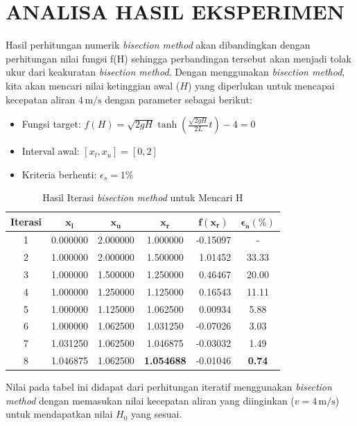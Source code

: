 \documentclass[conference]{IEEEtran}
\begin{document}
\section{ANALISA HASIL EKSPERIMEN}
Hasil perhitungan numerik \textit{bisection method} akan dibandingkan dengan perhitungan nilai fungsi f(H) sehingga perbandingan tersebut akan menjadi tolak ukur dari keakuratan \textit{bisection method}. Dengan menggunakan \textit{bisection method}, kita akan mencari nilai ketinggian awal ($H$) yang diperlukan untuk mencapai kecepatan aliran $4 \, \text{m/s}$ dengan parameter sebagai berikut:
\begin{itemize}
    \item Fungsi target: $f(H) = \sqrt{2gH} \tanh\left(\frac{\sqrt{2gH}}{2L}t\right) - 4 = 0$
    \item Interval awal: $[x_l, x_u] = [0, 2]$
    \item Kriteria berhenti: $\epsilon_s = 1\%$
\end{itemize}
\begin{table}[htbp]
\centering
\caption{Hasil Iterasi \textit{bisection method} untuk Mencari H}
\label{tab:hasil_bisection}
\renewcommand{\arraystretch}{1.2}
\begin{tabular}{|c|c|c|c|r|c|}
\hline
\textbf{Iterasi} & $\boldsymbol{x_l}$ & $\boldsymbol{x_u}$ & $\boldsymbol{x_r}$ & \multicolumn{1}{c|}{$\boldsymbol{f(x_r)}$} & $\boldsymbol{\epsilon_a (\%)}$ \\
\hline
1 & 0.000000 & 2.000000 & 1.000000 & -0.15097 & - \\
2 & 1.000000 & 2.000000 & 1.500000 & 1.01452 & 33.33 \\
3 & 1.000000 & 1.500000 & 1.250000 & 0.46467 & 20.00 \\
4 & 1.000000 & 1.250000 & 1.125000 & 0.16543 & 11.11 \\
5 & 1.000000 & 1.125000 & 1.062500 & 0.00934 & 5.88  \\
6 & 1.000000 & 1.062500 & 1.031250 & -0.07026 & 3.03  \\
7 & 1.031250 & 1.062500 & 1.046875 & -0.03032 & 1.49  \\
8 & 1.046875 & 1.062500 & \textbf{1.054688} & -0.01046 & \textbf{0.74} \\
\hline
\end{tabular}
\end{table}
Nilai pada tabel ini didapat dari perhitungan iteratif menggunakan \textit{bisection method} dengan memasukan nilai kecepatan aliran yang diinginkan ($v = 4 \, \text{m/s}$) untuk mendapatkan nilai $H_0$ yang sesuai.
\end{document}
